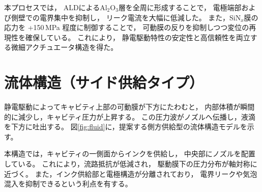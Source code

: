 \documentclass[conference]{IEEEtran}
\begin{document}
\begin{table}[t]
\centering
\caption{静電MEMSアクチュエータの代表的製造プロセス（400\,°C以下）}
\label{tab:process}
\end{table}

本プロセスでは，
ALDによるAl$_2$O$_3$層を全周に形成することで，
電極端部および側壁での電界集中を抑制し，
リーク電流を大幅に低減した。
また，SiN$_x$膜の応力を +150\,MPa 程度に制御することで，
可動膜の反りを抑制しつつ変位の再現性を確保している。
これにより，
静電駆動特性の安定性と高信頼性を両立する微細アクチュエータ構造を得た。

\section{流体構造（サイド供給タイプ）}
静電駆動によってキャビティ上部の可動膜が下方にたわむと，
内部体積が瞬間的に減少し，キャビティ圧力が上昇する。
この圧力波がノズルへ伝播し，液滴を下方に吐出する。
図\ref{fig:fluid}に，提案する側方供給型の流体構造モデルを示す。

本構造では，キャビティの一側面からインクを供給し，
中央部にノズルを配置している。
これにより，流路抵抗が低減され，
駆動膜下の圧力分布が軸対称に近づく。
また，インク供給部と電極構造が分離されており，
電界リークや気泡混入を抑制できるという利点を有する。
\end{document}
